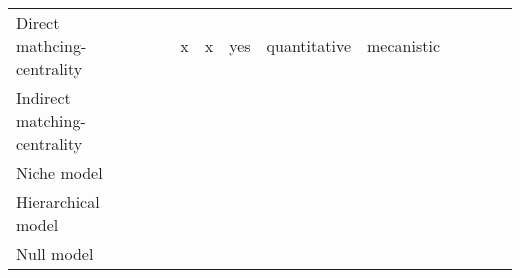 \begin{sidewaystable}
\begin{tabular}{llccccccccccc}
Direct mathcing-centrality                      &                               &                                         &                                  & x                         & x                             & yes                               & quantitative                      & mecanistic                     &                            &                                        &                                                                                                                                          \\
Indirect matching-centrality                    &                               &                                         &                                  &                           &                               &                                   &                                   &                                &                            &                                        &                                                                                                                                          \\
Niche model                                     &                               &                                         &                                  &                           &                               &                                   &                                   &                                &                            &                                        &                                                                                                                                          \\
Hierarchical model                              &                               &                                         &                                  &                           &                               &                                   &                                   &                                &                            &                                        &                                                                                                                                          \\
Null model                                      &                               &                                         &                                  &                           &                               &                                   &                                   &                                &                            &                                        &                                                                                                                                          \\

\end{tabular}
\end{sidewaystable}
